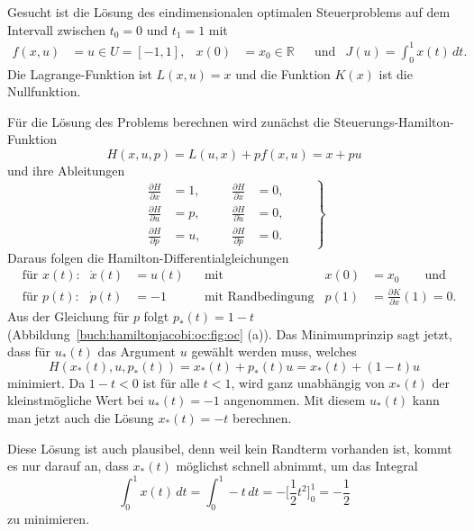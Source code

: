 \begin{beispiel}
\label{buch:hamiltonjacobi:oc:bsp:simple}
Gesucht ist die Lösung des eindimensionalen optimalen Steuerproblems
auf dem Intervall zwischen $t_0=0$ und $t_1=1$ mit
\begin{align*}
f(x,u) &= u\in U=[-1,1],
&
x(0) &= x_0\in\mathbb{R}
&
&\text{und}&
J(u)
=
\int_0^1 x(t)\,dt.
\end{align*}
Die Lagrange-Funktion ist $L(x,u)=x$ und die Funktion $K(x)$ ist die
Nullfunktion.

Für die Lösung des Problems berechnen wird zunächst die
Steuerungs-Hamilton-Funktion
\[
H(x,u,p)
=
L(u,x) + pf(x,u)
=
x + pu
\]
und ihre Ableitungen
\begin{equation}
\left.
\begin{aligned}
\frac{\partial H}{\partial x}
&=
1,
&&&
\frac{\partial H}{\partial\dot{x}}
&=
0,
\\
\frac{\partial H}{\partial u}
&=
p,
&&&
\frac{\partial H}{\partial\dot{u}}
&=
0,
\\
\frac{\partial H}{\partial p}
&=
u,
&&&
\frac{\partial H}{\partial\dot{p}}
&=
0.
\end{aligned}
\qquad
\right\}
\label{buch:hamiltonjacobi:oc:bsp:ableitungen}
\end{equation}
Daraus folgen die Hamilton-Differentialgleichungen
\begin{align*}
&\text{für $x(t)$:}&
\dot{x}(t)&=u(t)
&&\text{mit Anfangsbedingung}&
x(0)&=x_0
\qquad\text{und}
\\
&\text{für $p(t)$:}&
\dot{p}(t)&=-1
&&\text{mit Randbedingung}&
p(1)&=\frac{\partial K}{\partial x}(1) = 0.
\end{align*}
Aus der Gleichung für $p$ folgt $p_*(t)=1-t$
(Abbildung~\ref{buch:hamiltonjacobi:oc:fig:oc} (a)).
Das Minimumprinzip sagt jetzt, dass für $u_*(t)$ das Argument $u$
gewählt werden muss, welches
\[
H(x_*(t),u,p_*(t))
=
x_*(t)+p_*(t)u
=
x_*(t)+(1-t)u
\]
minimiert.
Da $1-t<0$ ist für alle $t<1$, wird ganz unabhängig von $x_*(t)$
der kleinstmögliche Wert bei $u_*(t)=-1$ angenommen.
Mit diesem $u_*(t)$ kann man jetzt auch die Lösung $x_*(t)=-t$
berechnen.

Diese Lösung ist auch plausibel, denn weil kein Randterm vorhanden ist,
kommt es nur darauf an, dass $x_*(t)$ möglichst schnell abnimmt, um
das Integral
\[
\int_0^1 x(t)\,dt
=
\int_0^1 -t\,dt
=
-\biggl[\frac12t^2\biggr]_0^1
=
-\frac12
\]
zu minimieren.
\end{beispiel}


